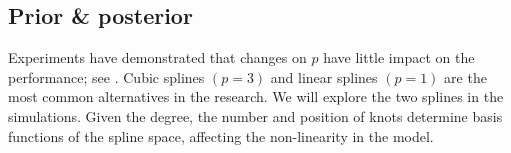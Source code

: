 \subsection{Prior \& posterior}

Experiments have demonstrated that changes on $p$ have little impact on the performance; see \citet{perperoglou2019review}. Cubic splines $(p=3)$ and linear splines $(p=1)$ are the most common alternatives in the research. We will explore the two splines in the simulations. Given the degree, the number and position of knots determine basis functions of the spline space, affecting the non-linearity in the model. 

